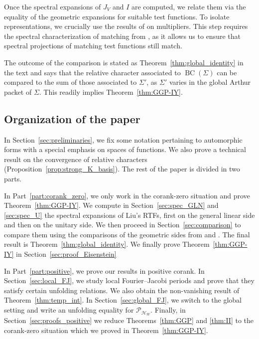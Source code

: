 \documentclass[letterpaper,11pt]{amsart}
\newcommand{\cH}{\mathcal{H}}
\newcommand{\cP}{\mathcal{P}}
\newcommand{\<}{\negthickspace}
\DeclareMathOperator{\BC}{BC}
\theoremstyle{definition}
\theoremstyle{plain}
\theoremstyle{remark}
\numberwithin{equation}{section}
\begin{document}
Once the spectral expansions of $J_V$ and $I$ are computed, we relate them via the equality of the geometric expansions for suitable test functions. To isolate representations, we crucially use the results of \cite{BPLZZ} on multipliers. This step requires the spectral characterization of matching from \cite{BLX2}, as it allows us to ensure that spectral projections of matching test functions still match.

The outcome of the comparison is stated as Theorem~\ref{thm:global_identity} in the text and says that the relative character associated to $\BC(\Sigma)$ can be compared to the sum of those associated to $\Sigma'$, as $\Sigma'$ varies in the global Arthur packet of $\Sigma$. This readily implies Theorem~\ref{thm:GGP-IY}.

\subsection{Organization of the paper}

In Section~\ref{sec:preliminaries}, we fix some notation pertaining to automorphic forms with a special emphasis on spaces of functions. We also prove a technical result on the convergence of relative characters (Proposition~\ref{prop:strong_K_basis}). The rest of the paper is divided in two parts.

In Part~\ref{part:corank_zero}, we only work in the corank-zero situation and prove Theorem~\ref{thm:GGP-IY}. We compute in Section~\ref{sec:spec_GLN} and \ref{sec:spec_U} the spectral expansions of Liu's RTFs, first on the general linear side and then on the unitary side. We then proceed in Section~\ref{sec:comparison} to compare them using the comparisons of the geometric sides from \cite{BLX1} and \cite{BLX2}. The final result is Theorem~\ref{thm:global_identity}. We finally prove Theorem~\ref{thm:GGP-IY} in Section~\ref{sec:proof_Eisenstein}

In Part~\ref{part:positive}, we prove our results in positive corank. In Section~\ref{sec:local_FJ}, we study local Fourier--Jacobi periods and prove that they satisfy certain unfolding relations. We also obtain the non-vanishing result of Theorem~\ref{thm:temp_int}. In Section~\ref{sec:global_FJ}, we switch to the global setting and write an unfolding equality for $\cP_{\cH_W}$. Finally, in Section~\ref{sec:proofs_positive} we reduce Theorems~\ref{thm:GGP} and \ref{thm:II} to the corank-zero situation which we proved in Theorem~\ref{thm:GGP-IY}.
\end{document}
